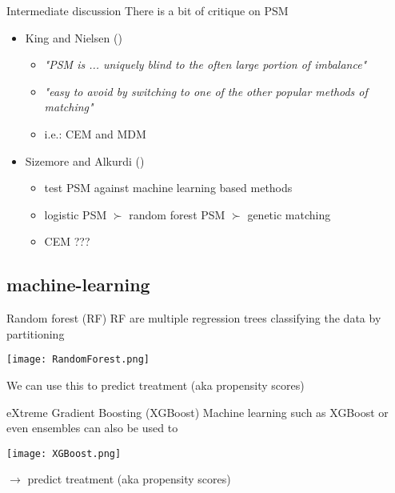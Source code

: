 \documentclass[aspectratio=169]{beamer}
\begin{document}
		\begin{frame}{Intermediate discussion}
			There is a bit of critique on PSM
			\begin{itemize}
				\item King and Nielsen (\citeyear{King2019})
				\begin{itemize}
					\item \textit{"PSM is ... uniquely blind to the often large portion of imbalance"}
					\item \textit{"easy to avoid by switching to one of the other popular methods of matching"}
					\item i.e.: CEM and MDM
				\end{itemize}
				\item Sizemore and Alkurdi (\citeyear{Sizemore2019})
				\begin{itemize}
					\item test PSM against machine learning based methods
					\item logistic PSM $\succ$ random forest PSM  $\succ$ genetic matching
					\item CEM ???
				\end{itemize}
			\end{itemize}
		\end{frame}

	\subsection{machine-learning}
		\begin{frame}{Random forest (RF)}
			RF are multiple regression trees classifying the data by partitioning
			\begin{center}
				\texttt{[image: RandomForest.png]}
			\end{center}
			We can use this to predict treatment (aka propensity scores)
		\end{frame}

		\begin{frame}{eXtreme Gradient Boosting (XGBoost)}
			Machine learning such as XGBoost or even ensembles can also be used to
			\begin{center}
				\texttt{[image: XGBoost.png]}
			\end{center}
			$\rightarrow$ predict treatment (aka propensity scores)
		\end{frame}
\end{document}
